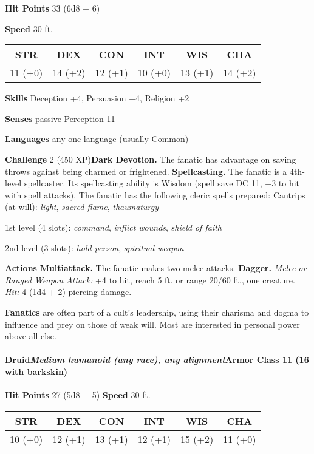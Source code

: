 \documentclass[
]{article}
\begin{document}
\textbf{Hit Points} 33 (6d8 + 6)

\textbf{Speed} 30 ft.

\begin{longtable}[]{@{}cccccc@{}}
\toprule
STR & DEX & CON & INT & WIS & CHA\tabularnewline
\midrule
\endhead
11 (+0) & 14 (+2) & 12 (+1) & 10 (+0) & 13 (+1) & 14 (+2)\tabularnewline
\bottomrule
\end{longtable}

\textbf{Skills} Deception +4, Persuasion +4, Religion +2

\textbf{Senses} passive Perception 11

\textbf{Languages} any one language (usually Common)

\textbf{Challenge} 2 (450 XP)\textbf{Dark Devotion.} The fanatic has
advantage on saving throws against being charmed or frightened.
\textbf{Spellcasting.} The fanatic is a 4th-level spellcaster. Its
spellcasting ability is Wisdom (spell save DC 11, +3 to hit with spell
attacks). The fanatic has the following cleric spells prepared: Cantrips
(at will): \emph{light}, \emph{sacred flame}, \emph{thaumaturgy}

1st level (4 slots): \emph{command}, \emph{inflict wounds}, \emph{shield
of faith}

2nd level (3 slots): \emph{hold person}, \emph{spiritual weapon}

\textbf{Actions} \textbf{Multiattack.} The fanatic makes two melee
attacks. \textbf{Dagger.} \emph{Melee or Ranged Weapon Attack:} +4 to
hit, reach 5 ft. or range 20/60 ft., one creature. \emph{Hit:} 4 (1d4 +
2) piercing damage.

\textbf{Fanatics} are often part of a cult's leadership, using their
charisma and dogma to influence and prey on those of weak will. Most are
interested in personal power above all else.

\hypertarget{druidmedium-humanoid-any-race-any-alignmentarmor-class-11-16-with-barkskin}{%
\paragraph{\texorpdfstring{Druid\emph{Medium humanoid (any race), any
alignment}\textbf{Armor Class} 11 (16 with
barkskin)}{DruidMedium humanoid (any race), any alignmentArmor Class 11 (16 with barkskin)}}\label{druidmedium-humanoid-any-race-any-alignmentarmor-class-11-16-with-barkskin}}

\textbf{Hit Points} 27 (5d8 + 5) \textbf{Speed} 30 ft.

\begin{longtable}[]{@{}cccccc@{}}
\toprule
STR & DEX & CON & INT & WIS & CHA\tabularnewline
\midrule
\endhead
10 (+0) & 12 (+1) & 13 (+1) & 12 (+1) & 15 (+2) & 11 (+0)\tabularnewline
\bottomrule
\end{longtable}
\end{document}
